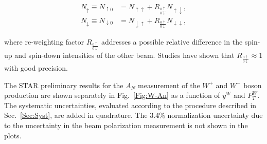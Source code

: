 \documentclass[12pt]{article}
\begin{document}
\begin{align}
N_{\uparrow}   \equiv N_{\uparrow0}   &= N_{\uparrow\uparrow}   + R_{\frac{0\uparrow}{0\downarrow}} N_{\uparrow\downarrow},\\
N_{\downarrow} \equiv N_{\downarrow0} &= N_{\downarrow\uparrow} + R_{\frac{0\uparrow}{0\downarrow}} N_{\downarrow\downarrow},
\end{align}

\noindent
where re-weighting factor $R_{\frac{0\uparrow}{0\downarrow}}$ addresses a
possible relative difference in the spin-up and spin-down intensities of the
other beam. Studies have shown that $R_{\frac{0\uparrow}{0\downarrow}} \approx
1$ with good precision.

The STAR preliminary results for the $A_{N}$ measurement of the $W^{+}$ and $W^{-}$ boson production are shown separately in Fig.~\ref{Fig:W-An} as a function of $y^{W}$ and $P_{T}^{W}$. 
The systematic uncertainties, evaluated according to the procedure described in Sec.~\ref{Sec:Syst}, are added in quadrature. 
The 3.4\% normalization uncertainty due to the uncertainty in the beam polarization measurement is not shown in the plots. 
\end{document}
